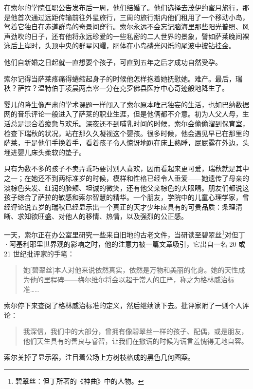 \documentclass[AutoFakeBold=true]{book}
\begin{document}
在索尔的学院任职公告发布后一周，他们结婚了。他们选择去茂伊约蜜月旅行，那是他首次通过远距传输前往外星旅行，三周的旅行期内他们租用了一个移动小岛，驾着它独自在赤道群岛的奇景间穿行。索尔永远不会忘记脑海里那些阳光普照、风声劲吹的日子，还有他将永远珍爱的一些私密的二人世界的景象，譬如萨莱晚间裸泳后上岸时，头顶中央的群星闪耀，胴体在小岛磷光闪烁的尾波中披钻挂金。

他们自新婚之日起就一直想要个孩子，可直到五年之后才成功自然受孕。

索尔记得当萨莱疼痛得蜷缩起身子的时候他怎样抱着她抚慰她。难产。最后，瑞秋？萨拉？温特伯于凌晨两点零一分在克罗佛县医疗中心奇迹般地降生了。

婴儿的降生像严肃的学术课题一样闯入了索尔原本唯己独妄的生活，也如巴纳数据网的音乐评论一般进入了萨莱的职业生涯，但是他俩都不介意。初为人父人母，生活总是混合着疲惫与欢乐。深夜还不到哺乳时间的时候，索尔会偷偷溜到保育室，检查下瑞秋的状况，站在那久久凝视这个婴孩。很多时候，他会遇见早已在那里的萨莱，于是他们手挽着手，看着孩子令人惊讶地趴在床上熟睡，屁屁露在外边，头埋进婴儿床头柔软的垫子。

只有为数不多的孩子不卖弄乖巧要讨别人喜欢，因而看起来更可爱，瑞秋就是其中之一；在她还不到两标准岁的时候，模样和性格已经令人垂爱——她遗传了母亲的淡棕色头发、红润的脸颊、坦诚的微笑，还有他父亲棕色的大眼睛。朋友们都说这孩子综合了萨拉的敏感和索尔智慧的精华。一个朋友，学院中的儿童心理学家，曾经评论说五岁的瑞秋已经显示出一个真正的天才少年应具有的可贵品质：条理清晰、求知欲旺盛、对他人的移情、热情，以及强烈的公正感。

一天，索尔正在办公室里研究一些来自旧地的古老文件，当研读至碧翠丝\footnote{碧翠丝：但丁所著的《神曲》中的人物。}对但丁·阿基利耶里世界观的影响之时，他的注意力被一篇文章吸引，它出自一名 20 或 21 世纪批评家的手笔：

\begin{quotation}
	{\kaishu 她[碧翠丝]本人对他来说依然真实，依然是万物和美丽的化身。她的天性成为他的里程碑——梅尔维尔将会以超于常人的庄严，称之为格林威治标准……}
\end{quotation}

索尔停下来查阅了格林威治标准的定义，然后继续读下去。批评家附了一则个人评论：

\begin{quotation}
	{\kaishu 我深信，我们中的大部分，曾拥有像碧翠丝一样的孩子、配偶，或是朋友，他们天生具有的善良与睿智，让我们在撒谎的时候为谎言羞愧得无地自容。}
\end{quotation}

索尔关掉了显示器，注目着公场上方树枝格成的黑色几何图案。
\end{document}
